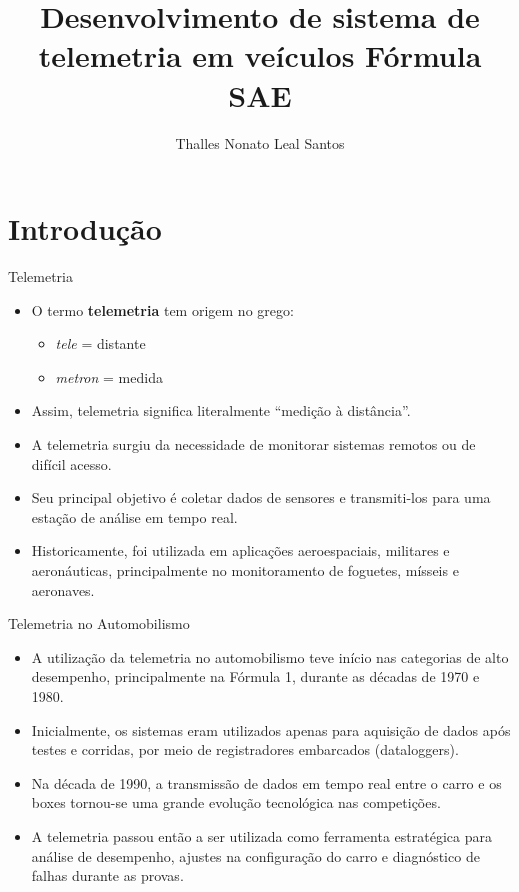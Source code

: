 \documentclass{beamer}
\title{Desenvolvimento de sistema de telemetria em veículos Fórmula SAE}
\author{Thalles Nonato Leal Santos}
\begin{document}
\maketitle

\section{Introdução}

\begin{frame}{Telemetria}
	\begin{itemize}
		
		 \item O termo \textbf{telemetria} tem origem no grego:
		\begin{itemize}
			\item \textit{tele} = distante
			\item \textit{metron} = medida
		\end{itemize}
		
		\item Assim, telemetria significa literalmente ``medição à distância''.
		
		
		\item A telemetria surgiu da necessidade de monitorar sistemas remotos ou de difícil acesso.
		
		
		\item Seu principal objetivo é coletar dados de sensores e transmiti-los para uma estação de análise em tempo real.
		
		\item Historicamente, foi utilizada em aplicações aeroespaciais, militares e aeronáuticas, principalmente no monitoramento de foguetes, mísseis e aeronaves.
		

	\end{itemize}
\end{frame}

\begin{frame}{Telemetria no Automobilismo}
	\begin{itemize}
		\item A utilização da telemetria no automobilismo teve início nas categorias de alto desempenho, principalmente na Fórmula 1, durante as décadas de 1970 e 1980.
		
		\item Inicialmente, os sistemas eram utilizados apenas para aquisição de dados após testes e corridas, por meio de registradores embarcados (dataloggers).

		\item Na década de 1990, a transmissão de dados em tempo real entre o carro e os boxes tornou-se uma grande evolução tecnológica nas competições.
		
		\item A telemetria passou então a ser utilizada como ferramenta estratégica para análise de desempenho, ajustes na configuração do carro e diagnóstico de falhas durante as provas.
	\end{itemize}
\end{frame}
\end{document}
